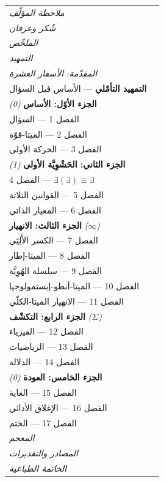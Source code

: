 \documentclass[10pt, openany, oneside]{book}
\renewcommand{\small}{\fontsize{9}{11.5}\selectfont}
\begin{document}
{\small
\noindent\begin{tabular}{@{} l @{\hspace{1em}} r @{}}
\textit{ملاحظة المؤلّف} & \\
\textit{شُكر وعرفان} & \\
\textit{الملخّص} & \\
\textit{التمهيد} & \\
\textit{المقدّمة: الأسفار العشرة} & \\[0.5em]
\textbf{التمهيد التأمّلي} --- الأساس قبل السؤال & \\[0.8em]

\textbf{الجزء الأوّل: الأساس} \textit{(0)} & \\[0.3em]
\quad الفصل 1 --- السؤال & \\
\quad الفصل 2 --- الميتا-قوّة & \\
\quad الفصل 3 --- الحركة الأولى & \\[0.8em]

\textbf{الجزء الثاني: الحَشْوِيَّة الأولى} \textit{(1)} & \\[0.3em]
\quad الفصل 4 --- $\exists(\exists) \equiv \exists$ & \\
\quad الفصل 5 --- القوانين الثلاثة & \\
\quad الفصل 6 --- المعيار الذاتي & \\[0.8em]

\textbf{الجزء الثالث: الانهيار} \textit{($\infty$)} & \\[0.3em]
\quad الفصل 7 --- الكسر الأَلِثِي & \\
\quad الفصل 8 --- الميتا-إطار & \\
\quad الفصل 9 --- سلسلة الهُوِيَّة & \\
\quad الفصل 10 --- الميتا-أنطو-إبستمولوجيا & \\
\quad الفصل 11 --- الانهيار الميتا-الكلّي & \\[0.8em]

\textbf{الجزء الرابع: التكشّف} \textit{($\Sigma$)} & \\[0.3em]
\quad الفصل 12 --- الفيزياء & \\
\quad الفصل 13 --- الرياضيات & \\
\quad الفصل 14 --- الدلالة & \\[0.8em]

\textbf{الجزء الخامس: العودة} \textit{(0)} & \\[0.3em]
\quad الفصل 15 --- الغاية & \\
\quad الفصل 16 --- الإغلاق الأدائي & \\
\quad الفصل 17 --- الختم & \\[0.8em]

\textit{المعجم} & \\
\textit{المصادر والتقديرات} & \\
\textit{الخاتمة الطباعية} & \\
\end{tabular}
}
\end{document}
